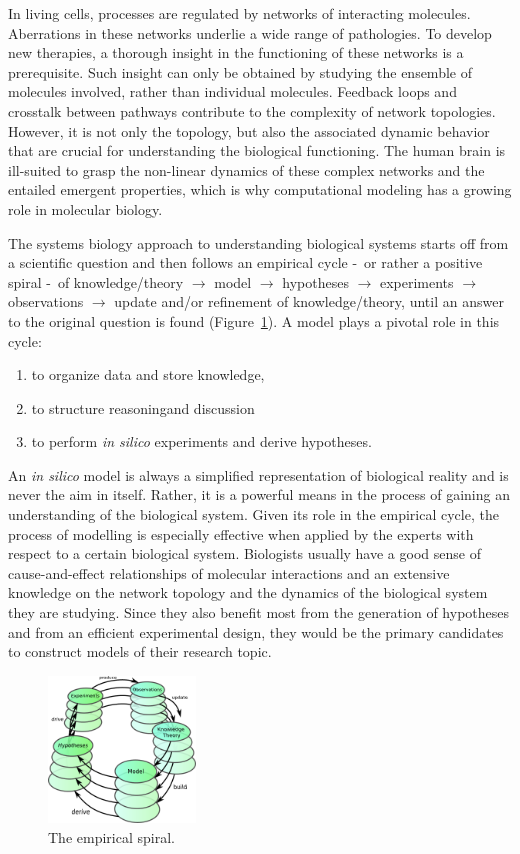 In living cells, processes are regulated by networks of interacting molecules.
Aberrations in these networks underlie a wide range of pathologies. To develop new therapies,
a thorough insight in the functioning of these networks is a prerequisite. Such insight can only be obtained
by studying the ensemble of molecules involved, rather than individual molecules. Feedback loops and 
crosstalk between pathways contribute to the complexity of network topologies. However, it is not only 
the topology, but also the associated dynamic behavior that are crucial for understanding 
the biological functioning.
The human brain is ill-suited to grasp the non-linear dynamics of these complex networks and
the entailed emergent properties, which is why computational modeling has a growing role in molecular biology.

The systems biology approach to understanding biological systems starts off from a
scientific question and then follows an empirical cycle \--\ or rather a positive spiral \--\ of
knowledge/theory $\rightarrow$ model $\rightarrow$ hypotheses $\rightarrow$ experiments $\rightarrow$
observations $\rightarrow$ update and/or refinement of knowledge/theory,
until an answer to the original question is found (Figure~\ref{fig:empirical-spiral}).
A model plays a pivotal role in this cycle:
\begin{enumerate}
  \item to organize data and store knowledge,
  \item to structure reasoningand discussion
  \item to perform \emph{in silico} experiments and derive hypotheses.
\end{enumerate}
An \emph{in silico} model is always a simplified representation of biological reality and is never the 
aim in itself.
Rather, it is a powerful means in the process of gaining an understanding of the biological system.
Given its role in the empirical cycle, the process of modelling is especially effective
when applied by the experts with respect to a certain biological system. Biologists usually have a good sense 
of cause-and-effect relationships of molecular interactions and an extensive knowledge 
on the network topology and the dynamics of the biological system they are studying.
Since they also benefit most from the generation of hypotheses and from an efficient experimental design, they 
would be the primary candidates to construct models of their research topic.

\begin{figure}[!htb]
  \centering
  \includegraphics[width=0.35\textwidth]{images/empirical_spiral4}
 \caption{The empirical spiral.}\label{fig:empirical-spiral}
\end{figure}


